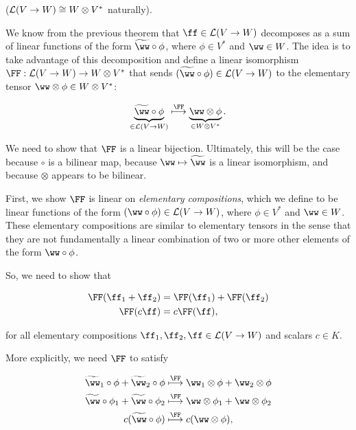 \begin{deriv}
\label{ch::motivated_intro::deriv::linear_functions_V_W_iso_W_Vstar}
    ($\mathcal{L}(V \rightarrow W) \cong W \otimes V^*$ naturally).
    
    We know from the previous theorem that $\ff \in \LLLL(V \rightarrow W)$ decomposes as a sum of linear functions of the form $\tww \circ \phi$, where $\phi \in V^*$ and $\ww \in W$. The idea is to take advantage of this decomposition and define a linear isomorphism $\FF:\LLLL(V \rightarrow W) \rightarrow W \otimes V^*$ that sends ${(\tww \circ \phi) \in \LLLL(V \rightarrow W)}$ to the elementary tensor $\ww \otimes \phi \in W \otimes V^*$:
    
    \begin{align*}
        \underbrace{\tww \circ \phi}_{\in \LLLL(V \rightarrow W)} \overset{\FF}{\longmapsto} \underbrace{\ww \otimes \phi}_{\in W \otimes V^*}.
    \end{align*}
    
    We need to show that $\FF$ is a linear bijection. Ultimately, this will be the case because $\circ$ is a bilinear map, because $\ww \mapsto \tww$ is a linear isomorphism, and because $\otimes$ appears to be bilinear.
    
    First, we show $\FF$ is linear on \textit{elementary compositions}, which we define to be linear functions of the form $(\ww \circ \phi) \in \LLLL(V \rightarrow W)$, where $\phi \in V^*$ and $\ww \in W$. These elementary compositions are similar to elementary tensors in the sense that they are not fundamentally a linear combination of two or more other elements of the form $\ww \circ \phi$.
    
    So, we need to show that
    
    \begin{align*}
        \FF(\ff_1 + \ff_2) &= \FF(\ff_1) + \FF(\ff_2) \\
        \FF(c\ff) &= c\FF(\ff),
    \end{align*}
    
    for all elementary compositions $\ff_1, \ff_2, \ff \in \LLLL(V \rightarrow W)$ and scalars $c \in K$.
    
    More explicitly, we need $\FF$ to satisfy
    
    \begin{align*}
        \tww_1 \circ \phi + \tww_2 \circ \phi 
        &\overset{\FF}{\longmapsto}
        \ww_1 \otimes \phi + \ww_2 \otimes \phi
        \\
        \tww \circ \phi_1 + \tww \circ \phi_2 
        &\overset{\FF}{\longmapsto}
        \ww \otimes \phi_1 + \ww \otimes \phi_2
        \\
        c (\tww \circ \phi)
        &\overset{\FF}{\longmapsto}
        c (\ww \otimes \phi),
    \end{align*}
    

\end{deriv}

